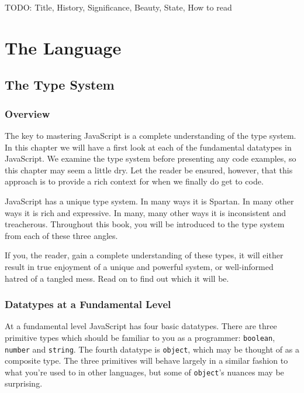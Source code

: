 \documentclass[11pt,letter]{book}
\begin{document}
    
    
    
    
    
    
    
    
    
    
    
    
    
    
    TODO: Title, History, Significance, Beauty, State, How to read
    
    \mainmatter
    
    \part{The Language}
    \chapter{The Type System}
    \section{Overview}
    The key to mastering JavaScript is a complete understanding of the type system. In this chapter
    we will have a first look at each of the fundamental datatypes in JavaScript. We examine the 
    type system before presenting any code examples, so this chapter may seem a little dry. Let the 
    reader be ensured, however, that this approach is to provide a rich context for when we finally
    do get to code.
    
    JavaScript has a unique type system. In many ways it is Spartan. In many other ways 
    it is rich and expressive. In many, many other ways it is inconsistent and treacherous.
    Throughout this book, you will be introduced to the type system from each of these three 
    angles.
    
    If you, the reader, gain a complete understanding of these types, it will either result 
    in true enjoyment of a unique and powerful system, or well-informed hatred of a tangled 
    mess. Read on to find out which it will be.
    
    \section{Datatypes at a Fundamental Level}
    At a fundamental level JavaScript has four basic datatypes. There are three primitive 
    types which should be familiar to you as a programmer: \texttt{boolean}, \texttt{number} 
    and \texttt{string}. The fourth datatype is \texttt{object}, which may be thought of as a 
    composite type. The three primitives will behave largely in a similar fashion to what you're 
    used to in other languages, but some of \texttt{object}'s nuances may be surprising.
    
\end{document}
